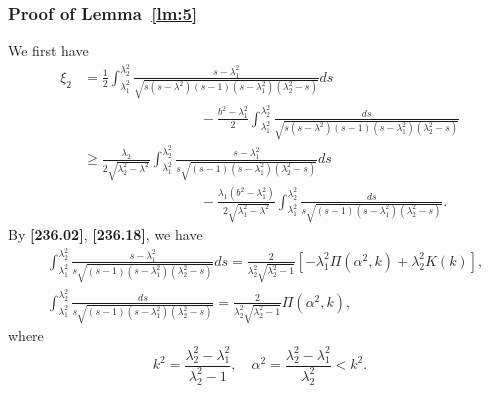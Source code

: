 \documentclass[11pt]{amsart}
\numberwithin{equation}{section}
\numberwithin{figure}{section}
\theoremstyle{plain} %
\theoremstyle{definition} %
\begin{document}
\subsubsection{Proof of Lemma~\ref{lm:5}} %

We first have 
\begin{align*}
\xi_2 
&= \frac{1}{2}
\int_{\lambda_1^2}^{\lambda_2^2} \frac{s-\lambda_1^2}{\sqrt{s(s-\lambda^2)(s-1)(s-\lambda_1^2)(\lambda_2^2-s)}}ds \\ 
&\hspace{100pt}
 - \frac{b^2-\lambda_1^2}{2}\int_{\lambda_1^2}^{\lambda_2^2} \frac{ds}{\sqrt{s(s-\lambda^2)(s-1)(s-\lambda_1^2)(\lambda_2^2-s)}} \\
& \geq 
\frac{\lambda_2}{2 \sqrt{\lambda_2^2-\lambda^2}}
\int_{\lambda_1^2}^{\lambda_2^2} \frac{s-\lambda_1^2}{s\sqrt{(s-1)(s-\lambda_1^2)(\lambda_2^2-s)}}ds \\ 
&\hspace{100pt} 
- \frac{\lambda_1(b^2-\lambda_1^2)}{2\sqrt{\lambda_1^2-\lambda^2}}\int_{\lambda_1^2}^{\lambda_2^2} \frac{ds}{s\sqrt{(s-1)(s-\lambda_1^2)(\lambda_2^2-s)}}. 
\end{align*}
By \textbf{[236.02]}, \textbf{[236.18]},
we have 
\begin{align*}
& \int_{\lambda_1^2}^{\lambda_2^2} \frac{s-\lambda_1^2}{s\sqrt{(s-1)(s-\lambda_1^2)(\lambda_2^2-s)}}ds 
= \frac{2}{\lambda_2^2\sqrt{\lambda_2^2-1}} [-\lambda_1^2 \Pi (\alpha^2,k) +\lambda_2^2 K (k) ], \\
& \int_{\lambda_1^2}^{\lambda_2^2} \frac{ds}{s\sqrt{(s-1)(s-\lambda_1^2)(\lambda_2^2-s)}} 
= \frac{2}{\lambda_2^2\sqrt{\lambda_2^2-1}} \Pi (\alpha^2,k), 
\end{align*}
where 
\[
k^2 = \frac{\lambda_2^2-\lambda_1^2}{\lambda_2^2-1}, \quad
\alpha^2 = \frac{\lambda_2^2-\lambda_1^2}{\lambda_2^2}<k^2.
\]
\end{document}
